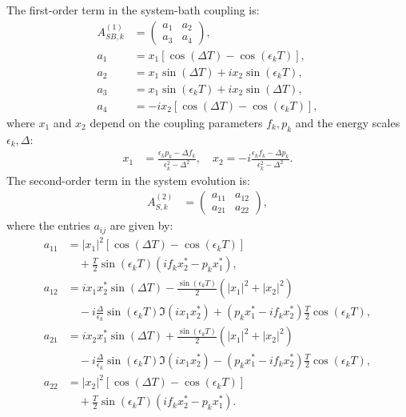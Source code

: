 The first-order term in the system-bath coupling is:
\begin{align}
    \label{eq:Asb1}
    A_{SB,k}^{(1)} &= \begin{pmatrix}
                          a_1 &a_2\\
                          a_3 &a_4
                      \end{pmatrix},\\
    a_1            &=x_1 \left[\cos(\Delta T) - \cos(\epsilon_k T)\right],\nonumber\\
    a_2            &=x_1 \sin(\Delta T) + i x_2 \sin(\epsilon_k T),\nonumber\\
    a_3            &=x_1 \sin(\epsilon_k T) + i x_2 \sin(\Delta T),\nonumber\\
    a_4            &=-i x_2 \left[\cos(\Delta T) - \cos(\epsilon_k T)\right],\nonumber
\end{align}
where $x_1$ and $x_2$ depend on the coupling parameters $f_k, p_k$ and the energy scales $\epsilon_k, \Delta$:
\begin{align}
    x_1 &= \frac{\epsilon_k p_k - \Delta f_k}{\epsilon_k^2 - \Delta^2}, \quad
    x_2 = -i \frac{\epsilon_k f_k - \Delta p_k}{\epsilon_k^2 - \Delta^2}. \label{eq:x1_x2_definition}
\end{align}
The second-order term in the system evolution is:
\begin{align}
    A_{S,k}^{(2)} &= \begin{pmatrix}
                         a_{11} &a_{12}\\
                         a_{21} &a_{22}
                     \end{pmatrix}, \label{eq:As2}
\end{align}
where the entries $a_{ij}$ are given by:
\begin{align}
    \label{eq:As2_entries}
    a_{11} &= |x_1|^2 \left[\cos(\Delta T) - \cos(\epsilon_k T)\right] \nonumber\\
           &\quad + \frac{T}{2} \sin(\epsilon_k T) \left(i f_k x^*_2 - p_k x^*_1\right), \nonumber\\
    a_{12} &= i x_1 x^*_2 \sin(\Delta T) - \frac{\sin(\epsilon_k T)}{2} \left(|x_1|^2 + |x_2|^2\right) \nonumber\\
           &\quad - i \frac{\Delta}{\epsilon_k} \sin(\epsilon_k T) \Im\left(i x_1 x^*_2\right) + \left(p_k x^*_1 - i f_k x^*_2\right) \frac{T}{2} \cos(\epsilon_k T), \nonumber\\
    a_{21} &= i x_2 x^*_1 \sin(\Delta T) + \frac{\sin(\epsilon_k T)}{2} \left(|x_1|^2 + |x_2|^2\right) \nonumber\\
           &\quad - i \frac{\Delta}{\epsilon_k} \sin(\epsilon_k T) \Im\left(i x_1 x^*_2\right) - \left(p_k x^*_1 - i f_k x^*_2\right) \frac{T}{2} \cos(\epsilon_k T), \nonumber\\
    a_{22} &= |x_2|^2 \left[\cos(\Delta T) - \cos(\epsilon_k T)\right] \nonumber\\
           &\quad + \frac{T}{2} \sin(\epsilon_k T) \left(i f_k x^*_2 - p_k x^*_1\right). \nonumber
\end{align}
